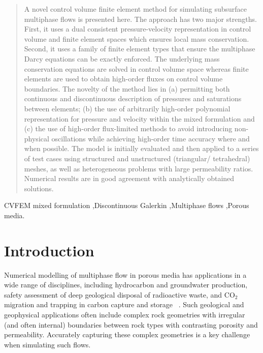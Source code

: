 \documentclass[preprint,authoryear,12pt]{elsarticle}
\begin{document}
\begin{frontmatter}
\begin{abstract}
  A novel control volume finite element method for simulating
  subsurface multiphase flows is presented here. The approach has two
  major strengths. First, it uses a dual consistent pressure-velocity
  representation in control volume and finite element spaces which
  ensures local mass conservation. Second, it uses a family of
  finite element types that ensure the multiphase Darcy equations can be
  exactly enforced. The underlying mass conservation equations are
  solved in control volume space whereas finite elements are used to
  obtain high-order fluxes on control volume boundaries. The novelty
  of the method lies in (a) permitting both continuous and
  discontinuous description of pressures and saturations between
  elements; (b) the use of arbitrarily high-order polynomial
  representation for pressure and velocity within the mixed
  formulation and (c) the use of high-order flux-limited methods to
  avoid introducing non-physical oscillations while achieving
  high-order time accuracy where and when possible. The model is
  initially evaluated and then applied to a series of test cases using
  structured and unstructured (triangular/ tetrahedral) meshes, as
  well as heterogeneous problems with large permeability
  ratios. Numerical results are in good agreement with analytically
  obtained solutions.
\end{abstract}

\begin{keyword} %
CVFEM mixed formulation \sep Discontinuous Galerkin  \sep Multiphase flows \sep Porous media.


\end{keyword}

\end{frontmatter}


\section{Introduction}
Numerical modelling of multiphase flow in porous media has
applications in a wide range of disciplines, including hydrocarbon and
groundwater production, safety assessment of deep geological disposal
of radioactive waste, and CO$_{\text{2}}$ migration and trapping in
carbon capture and storage ~\citep{chen_2006, aiea_1999, pruess_1990c,
  jiang_2011}. Such geological and geophysical applications often
include complex rock geometries with irregular (and often internal)
boundaries between rock types with contrasting porosity and
permeability.  Accurately capturing these complex geometries is a key
challenge when simulating such flows.
\end{document}
